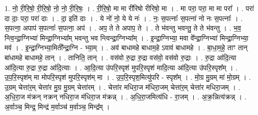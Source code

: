 \documentclass[17pt]{extarticle}
\begin{document}
1. नो॒ री॒रि॒षो॒ री॒रि॒षो॒ नो॒ नो॒ री॒रि॒षः॒ । . री॒रि॒षो॒ मा मा री॑रिषो रीरिषो॒ मा । . मा परा॒ परा॒ मा मा परा᳚ । . परा॑ दा दाः॒ परा॒ परा॑ दाः । . दा॒ इति॑ दाः । . ये नो॑ नो॒ ये ये नः॑ । . नः॒ स॒पत्नाः᳚ स॒पत्ना॑ नो नः स॒पत्नाः᳚ । . स॒पत्ना॒ अपाप॑ स॒पत्नाः᳚ स॒पत्ना॒ अप॑ । . अप॒ ते ते अपाप॒ ते । . ते भ॑वन्तु भवन्तु॒ ते ते भ॑वन्तु । . भ॒व॒ न्त्वि॒न्द्रा॒ग्निभ्या॑ मिन्द्रा॒ग्निभ्या᳚म् भवन्तु भव न्त्विन्द्रा॒ग्निभ्या᳚म् । . इ॒न्द्रा॒ग्निभ्या॒ मवा वे᳚न्द्रा॒ग्निभ्या॑ मिन्द्रा॒ग्निभ्या॒ मव॑ । . इ॒न्द्रा॒ग्निभ्या॒मिती᳚न्द्रा॒ग्नि - भ्या॒म् । . अव॑ बाधामहे बाधाम॒हे ऽवाव॑ बाधामहे । . बा॒धा॒म॒हे॒ ताꣳ तान् बा॑धामहे बाधामहे॒ तान् । . तानिति॒ तान् । . वस॑वो रु॒द्रा रु॒द्रा वस॑वो॒ वस॑वो रु॒द्राः । . रु॒द्रा आ॑दि॒त्या आ॑दि॒त्या रु॒द्रा रु॒द्रा आ॑दि॒त्याः । . आ॒दि॒त्या उ॑परि॒स्पृश॑ मुपरि॒स्पृश॑ मादि॒त्या आ॑दि॒त्या उ॑परि॒स्पृश᳚म् । . उ॒प॒रि॒स्पृश॑म् मा मोपरि॒स्पृश॑ मुपरि॒स्पृश॑म् मा । . उ॒प॒रि॒स्पृश॒मित्यु॑परि - स्पृश᳚म् । . मो॒ग्र मु॒ग्रम् मा॑ मो॒ग्रम् । . उ॒ग्रम् चेत्ता॑र॒म् चेत्ता॑र मु॒ग्र मु॒ग्रम् चेत्ता॑रम् । . चेत्ता॑र मधिरा॒ज म॑धिरा॒जम् चेत्ता॑र॒म् चेत्ता॑र मधिरा॒जम् । . अ॒धि॒रा॒ज म॑क्रन् नक्रन् नधिरा॒ज म॑धिरा॒ज म॑क्रन्न् । . अ॒धि॒रा॒जमित्य॑धि - रा॒जम् । . अ॒क्र॒न्नित्य॑क्रन्न् । . अ॒र्वाञ्च॒ मिन्द्र॒ मिन्द्र॑ म॒र्वाञ्च॑ म॒र्वाञ्च॒ मिन्द्र᳚म् । \newline
\end{document}
